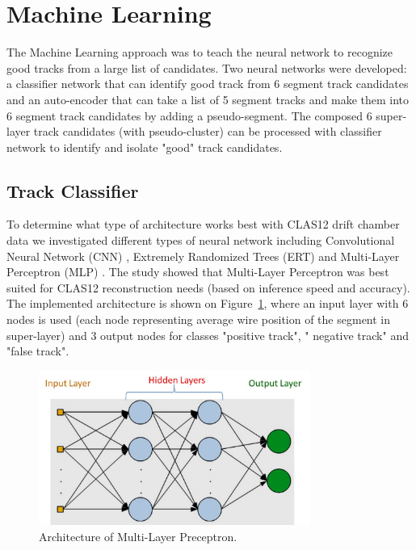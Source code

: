 \section{Machine Learning}

The Machine Learning approach was to teach the neural network to recognize good tracks
 from a large list of candidates. 
 Two neural networks were developed: a classifier network that can identify good track from  6 segment
 track candidates  and an auto-encoder that can take a list of 5 segment tracks and make them into 6 segment 
 track candidates by adding a pseudo-segment. The composed 6 super-layer track candidates (with pseudo-cluster)
 can be processed with classifier network to identify and isolate "good" track candidates.

 
 \subsection{Track Classifier}
 
 To determine what type of architecture works best with CLAS12 drift chamber data we investigated different 
 types of neural network including Convolutional Neural Network (CNN) , Extremely Randomized Trees (ERT) and 
 Multi-Layer Perceptron (MLP) \cite{Gavalian:2020oxg}. The study showed that Multi-Layer Perceptron was best suited for 
 CLAS12 reconstruction needs (based on inference speed and accuracy). The implemented architecture is shown on 
 Figure~\ref{mlp:architecture}, where an input layer with 6 nodes is used (each node representing average wire position 
 of the segment in super-layer) and 3 output nodes for classes "positive track", " negative track" and "false track".
 
 \begin{figure}[!ht]
\begin{center}
 \includegraphics[width=3.5in]{images/Multilayer-Perceptron.jpg}
\caption {Architecture of Multi-Layer Preceptron.}
 \label{mlp:architecture}
 \end{center}
\end{figure}

